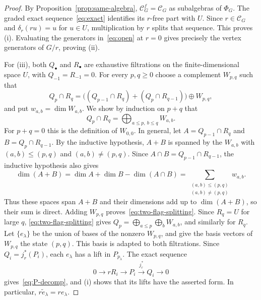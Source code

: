 \documentclass[reqno]{article}
\theoremstyle{plain} %
\theoremstyle{definition}
\theoremstyle{remark}
\newcommand {\CC}{\mathscr{C}}
\numberwithin{equation}{section}
\begin{document}
\begin{proof}
By Proposition~\ref{prop:same-algebra}, \(\CC^f_G=\CC_G\) as subalgebras of
\(\Phi_G\). The graded exact sequence~\eqref{eq:exact} identifies its
\(r\)-free part with \(U\). Since \(r\in\CC_G\) and
\(\delta_r(ru)=u\) for \(u\in U\), multiplication by \(r\) splits
that sequence. This proves (i). Evaluating the generators in~\eqref{eq:open}
at \(r=0\) gives precisely the vertex generators of \(G/r\), proving (ii).

For (iii), both \(Q_\bullet\) and \(R_\bullet\) are exhaustive
filtrations on the finite-dimensional space \(U\), with
\(Q_{-1}=R_{-1}=0\). For every \(p,q\ge0\)
choose a complement \(W_{p,q}\) such that
\[
Q_p\cap R_q=
\bigl((Q_{p-1}\cap R_q)+(Q_p\cap R_{q-1})\bigr)\oplus W_{p,q},
\]
and put \(w_{a,b}=\dim W_{a,b}\). We show by induction on \(p+q\) that
\begin{equation}\label{eq:two-flag-splitting}
Q_p\cap R_q=\bigoplus_{a\le p,\ b\le q}W_{a,b}.
\end{equation}
For \(p+q=0\) this is the definition of \(W_{0,0}\). In general, let
\(A=Q_{p-1}\cap R_q\) and \(B=Q_p\cap R_{q-1}\). By the inductive
hypothesis, \(A+B\) is spanned by the \(W_{a,b}\) with
\((a,b)\le(p,q)\) and \((a,b)\ne(p,q)\). Since
\(A\cap B=Q_{p-1}\cap R_{q-1}\), the inductive hypothesis also gives
\[
\dim(A+B)=\dim A+\dim B-\dim(A\cap B)
=\sum_{\substack{(a,b)\le(p,q)\\(a,b)\ne(p,q)}}w_{a,b}.
\]
Thus these spaces span \(A+B\) and their dimensions add up to
\(\dim(A+B)\), so their sum is direct. Adding \(W_{p,q}\)
proves~\eqref{eq:two-flag-splitting}. Since \(R_q=U\) for large \(q\), \eqref{eq:two-flag-splitting} gives
\(Q_p=\bigoplus_{a\le p}\bigoplus_bW_{a,b}\), and similarly for \(R_q\).
Let \(\{e_\lambda\}\) be the union of bases of the nonzero \(W_{p,q}\),
and give the basis vectors of \(W_{p,q}\) the state \((p,q)\). This basis
is adapted to both filtrations. Since \(Q_i=j_r^*(P_i)\), each
\(e_\lambda\) has a lift in \(P_{p_\lambda}\). The exact sequence
\[
0\longrightarrow rR_i\longrightarrow P_i
\xrightarrow{\ j_r^*\ }Q_i\longrightarrow0
\]
gives~\eqref{eq:P-decomp}, and (i) shows that its lifts have the asserted
form. In particular, \(r\widetilde e_\lambda=re_\lambda\).
\end{proof}
\end{document}
